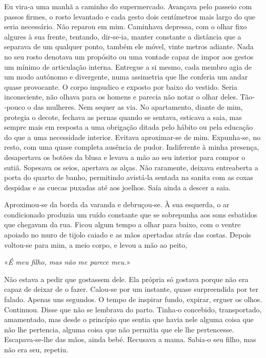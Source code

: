 Eu vira­‑a uma manhã a caminho do supermercado. Avançava pelo passeio
com passos firmes, o rosto levantado e cada gesto dois centímetros mais
largo do que seria necessário. Não reparou em mim. Caminhava depressa,
com o olhar fixo algures à sua frente, tentando, dir­‑se­‑ia, manter
constante a distância que a separava de um qualquer ponto, também ele
móvel, vinte metros adiante. Nada no seu rosto denotava um propósito ou
uma vontade capaz de impor aos gestos um mínimo de articulação interna.
Entregue a si mesmo, cada membro agia de um modo autónomo e divergente,
numa assimetria que lhe conferia um andar quase provocante. O corpo
impudico e exposto por baixo do vestido. Seria inconsciente, não olhava
para os homens e parecia não notar o olhar deles. Tão­‑pouco o das
mulheres. Nem sequer as via. No apartamento, diante de mim, protegia o
decote, fechava as pernas quando se sentava, esticava a saia, mas sempre
mais em resposta a uma obrigação ditada pelo hábito ou pela educação do
que a uma necessidade interior. Evitava aproximar­‑se de mim.
Expunha­‑se, no resto, com uma quase completa ausência de pudor.
Indiferente à minha presença, desapertava os botões da blusa e levava a
mão ao seu interior para compor o sutiã. Sopesava os seios, apertava as
alças. Não raramente, deixava entreaberta a porta do quarto de banho,
permitindo avistá­‑la sentada na sanita com as coxas despidas e as
cuecas puxadas até aos joelhos. Saía ainda a descer a saia.

Aproximou­‑se da borda da varanda e debruçou­‑se. À sua esquerda, o ar
condicionado produzia um ruído constante que se sobrepunha aos sons
esbatidos que chegavam da rua. Ficou algum tempo a olhar para baixo, com
o ventre apoiado no muro de tijolo caiado e as mãos apertadas atrás das
costas. Depois voltou­‑se para mim, a meio corpo, e levou a mão ao
peito,

«\emph{É meu filho, mas não me parece meu.}»

Não estava a pedir que gostassem dele. Ela própria só gostava porque não
era capaz de deixar de o fazer. Calou­‑se por um instante, quase
surpreendida por ter falado. Apenas uns segundos. O tempo de inspirar
fundo, expirar, erguer os olhos. Continuou. Disse que não se lembrava do
parto. Tinha­‑o concebido, transportado, amamentado, mas desde o
princípio que sentia que havia nele alguma coisa que não lhe pertencia,
alguma coisa que não permitia que ele lhe pertencesse. Escapava­‑se­‑lhe
das mãos, ainda bebé. Recusava a mama. Sabia­‑o seu filho, mas não era
seu, repetiu.

